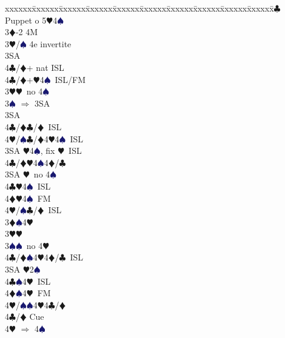 \documentclass[a4paper,italian]{article}
\newcommand{\BC}{\textcolor{OliveGreen}{$\clubsuit$}}
\newcommand{\BD}{\textcolor{RedOrange}{$\vardiamondsuit$}}
\newcommand{\BH}{\textcolor{Red2}{$\varheartsuit${}}}
\newcommand{\BS}{\textcolor{MidnightBlue}{$\spadesuit${}}}
\newenvironment{bidtable}
{\begin{tabbing}

    xxxxxx\=xxxxxx\=xxxxxx\=xxxxxx\=xxxxxx\=xxxxxx\=xxxxxx\=xxxxxx\=xxxxxx\=xxxxxx\=\kill}
{\end{tabbing} }%
\begin{document}
\begin{multicols}{2}
\begin{bidtable}
                                            3\BC \> Puppet o 5\BH 4\BS \+\\
                                            3\BD {}-2 4M\+\\
                                            3\BH/\BS \> 4e invertite\+\\
                                            3SA\+\\
                                            4\BC/\BD {}+ nat ISL\-\-\\
                                            4\BC/\BD {}+\BH4\BS\ ISL/FM\-\\
                                            3\BH {}\BH\ no 4\BS \+\\
                                            3\BS \> $\Rightarrow$ 3SA\+\\
                                            3SA\+\\
                                            4\BC/\BD {}\BC /\BD\ ISL\\
                                            4\BH/\BS {}\BC /\BD 4\BH 4\BS\ ISL\-\-\\
                                            3SA \BH 4\BS , fix \BH\ ISL\\
                                            4\BC/\BD {}\BH 4\BS 4\BD /\BC \-\\
                                            3SA \BH\ no 4\BS \+\\
                                            4\BC {}\BH 4\BS\ ISL\\
                                            4\BD {}\BH 4\BS\ FM\\
                                            4\BH/\BS {}\BC /\BD\ ISL\-\-\\
                                            3\BD {}\BS 4\BH \+\\
                                            3\BH {}\BH \\
                                            3\BS {}\BS\ no 4\BH \+\\
                                            4\BC/\BD {}\BS 4\BH 4\BD /\BC\ ISL\-\\
                                            3SA \BH 2\BS \+\\
                                            4\BC {}\BS 4\BH\ ISL\\
                                            4\BD {}\BS 4\BH\ FM\\
                                            4\BH/\BS {}\BS 4\BH 4\BC /\BD \-\\
                                            4\BC/\BD \> Cue\+\\
                                            4\BH \> $\Rightarrow$ 4\BS

                                        \end{bidtable}
                                    \end{multicols}
\end{document}

